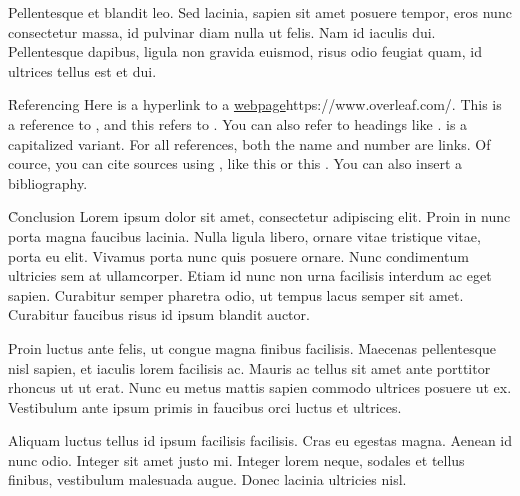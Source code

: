 \documentclass{article}
\begin{document}
Pellentesque et blandit leo. Sed lacinia, sapien sit amet posuere tempor, eros nunc consectetur massa, id pulvinar diam nulla ut felis. Nam id iaculis dui. Pellentesque dapibus, ligula non gravida euismod, risus odio feugiat quam, id ultrices tellus est et dui.

\h{Referencing}
Here is a hyperlink to a \url{webpage}{https://www.overleaf.com/}. This is a reference to , and this refers to . You can also refer to headings like .  is a capitalized variant. For all references, both the name and number are links. Of cource, you can cite sources using \c{\cite{...}}, like this \cite{minted} or this \cite{tabularray}. You can also insert a bibliography.

\h{Conclusion}
Lorem ipsum dolor sit amet, consectetur adipiscing elit. Proin in nunc porta magna faucibus lacinia. Nulla ligula libero, ornare vitae tristique vitae, porta eu elit. Vivamus porta nunc quis posuere ornare. Nunc condimentum ultricies sem at ullamcorper. Etiam id nunc non urna facilisis interdum ac eget sapien. Curabitur semper pharetra odio, ut tempus lacus semper sit amet. Curabitur faucibus risus id ipsum blandit auctor.

Proin luctus ante felis, ut congue magna finibus facilisis. Maecenas pellentesque nisl sapien, et iaculis lorem facilisis ac. Mauris ac tellus sit amet ante porttitor rhoncus ut ut erat. Nunc eu metus mattis sapien commodo ultrices posuere ut ex. Vestibulum ante ipsum primis in faucibus orci luctus et ultrices.

Aliquam luctus tellus id ipsum facilisis facilisis. Cras eu egestas magna. Aenean id nunc odio. Integer sit amet justo mi. Integer lorem neque, sodales et tellus finibus, vestibulum malesuada augue. Donec lacinia ultricies nisl.

\toc

\end{document}
